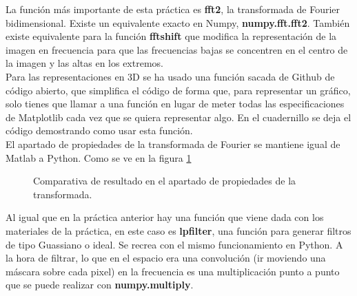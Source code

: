 \documentclass[a4paper,12pt]{report}
\begin{document}
La función más importante de esta práctica es \textbf{fft2}, la transformada de Fourier bidimensional. Existe un equivalente exacto en Numpy,  \textbf{numpy.fft.fft2}. También existe equivalente para la función \textbf{fftshift} que modifica la representación de la imagen en frecuencia para que las frecuencias bajas se concentren en el centro de la imagen y las altas en los extremos.\\

Para las representaciones en 3D se ha usado una función sacada de Github de código abierto, que simplifica el código de forma que, para representar un gráfico, solo tienes que llamar a una función en lugar de meter todas las especificaciones de Matplotlib cada vez que se quiera representar algo. En el cuadernillo se deja el código demostrando como usar esta función.\\

El apartado de propiedades de la transformada de Fourier se mantiene igual de Matlab a Python. Como se ve en la figura \ref{zoom}\\

\begin{figure}[!tbp]
  \centering
  \hfill
  \caption{Comparativa de resultado en el apartado de propiedades de la transformada.}
  \label{zoom}
\end{figure}

Al igual que en la práctica anterior hay una función que viene dada con los materiales de la práctica, en este caso es  \textbf{lpfilter}, una función para generar filtros de tipo Guassiano o ideal. Se recrea con el mismo funcionamiento en Python. A la hora de filtrar, lo que en el espacio era una convolución (ir moviendo una máscara sobre cada pixel) en la frecuencia es una multiplicación punto a punto que se puede realizar con \textbf{numpy.multiply}.\\
\end{document}
